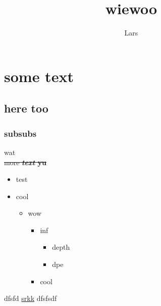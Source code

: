 \documentclass[a4paper,12pt]{article}
\author{Lars}
\begin{document}
\title{wiewoo}
\maketitle
\tableofcontents\newpage
\section*{some text}
\subsection*{here too}
\subsubsection*{subsubs}
wat
 \\ 
\sout{more \textbf{\textit{text} yu}}
 \\ 
\begin{itemize}
\item test
\item cool
\begin{itemize}
\item wow
\begin{itemize}
\item inf
\begin{itemize}
\item depth
\item dpe
\end{itemize}
\item cool
\end{itemize}
\end{itemize}
\end{itemize}
dfsfd \href{https://beaversinfos.weebly.com/}{srkk} dfsfsdf
 \\ 
\end{document}
